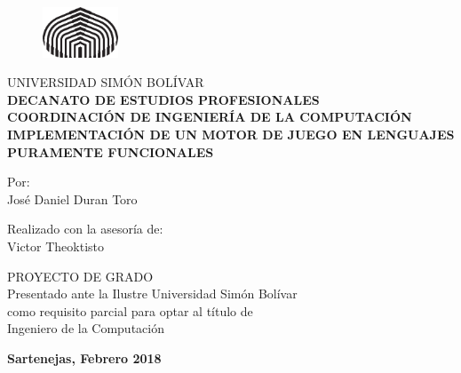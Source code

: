 \documentclass[letterpaper,12pt,times,oneside,numbered,print,index,custommargin,PageStyleI]{Classes/PhDThesisPSnPDF}
\begin{document}

\frontmatter

\graphicspath{{Figs/}}
\begin{titlepage}

\begin{figure}[!htbp!]
\centering
\includegraphics[width=0.2\textwidth]{University_Crest}
\end{figure}

\begin{center}

\Large UNIVERSIDAD SIMÓN BOLÍVAR\\
\large \textbf {DECANATO DE ESTUDIOS PROFESIONALES}\\
\large \textbf {COORDINACIÓN DE INGENIERÍA DE LA COMPUTACIÓN}\\

\vfill
\large \textbf {IMPLEMENTACIÓN DE UN MOTOR DE JUEGO EN LENGUAJES PURAMENTE FUNCIONALES}

\vfill
Por:\\
José Daniel Duran Toro

\vfill
Realizado con la asesoría de:\\
Victor Theoktisto

\vfill
\large PROYECTO DE GRADO\\
Presentado ante la Ilustre Universidad Simón Bolívar\\
como requisito parcial para optar al título de\\
Ingeniero de la Computación

\vfill
\textbf {Sartenejas, Febrero 2018}

\end{center}

\end{titlepage}


%
%
%

\end{document}
